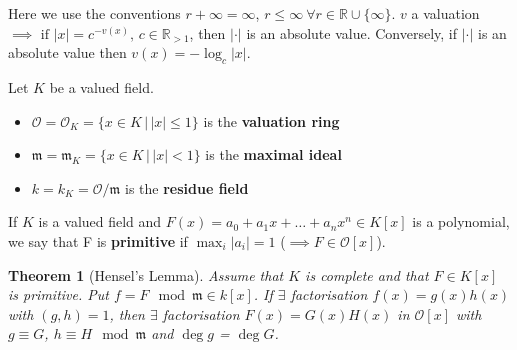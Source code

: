\documentclass[a4paper]{article}
\newtheorem{theorem}[definition]{Theorem}
\newcommand*\abs[1]{\left|#1\right|}
\begin{document}
Here we use the conventions $r+\infty = \infty$, $r \leq \infty\ \forall r \in \mathbb{R} \cup \{\infty\}$.
$v$ a valuation $\implies \text{ if } \abs{x} = c^{-v(x)},\, c \in \mathbb{R}_{>1}$,
then $\abs{\cdot}$ is an absolute value.
Conversely, if $\abs{\cdot}$ is an absolute value then $v(x)=-\log_c\abs{x}$.

Let $K$ be a valued field.
\begin{itemize}
	\item $\mathcal{O} = \mathcal{O}_K = \{x \in K \,|\, \abs{x} \leq 1\}$ is the \textbf{valuation ring}
	\item $\mathfrak{m} = \mathfrak{m}_K = \{x \in K \,|\, \abs{x} < 1\}$ is the \textbf{maximal ideal}
	\item $k = k_K = \mathcal{O}/\mathfrak{m}$ is the \textbf{residue field}
\end{itemize}

If $K$ is a valued field and $F(x)=a_0 + a_1 x + \dots + a_n x^n \in K[x]$ is a polynomial,
we say that F is \textbf{primitive} if $\max_i \abs{a_i} = 1$ ($\implies F \in \mathcal{O}[x]$).

\begin{theorem}[Hensel's Lemma]
	Assume that $K$ is complete and that $F \in K[x]$ is primitive.
	Put $f = F \mod \mathfrak{m} \in k[x]$.
	If $\exists$ factorisation $f(x)=g(x)h(x)$ with $(g,h)=1$,
	then $\exists$ factorisation $F(x)=G(x)H(x)$ in $\mathcal{O}[x]$ with $g \equiv G$, $h \equiv H \mod \mathfrak{m}$ and $\deg g$ = $\deg G$.
\end{theorem}
\end{document}
